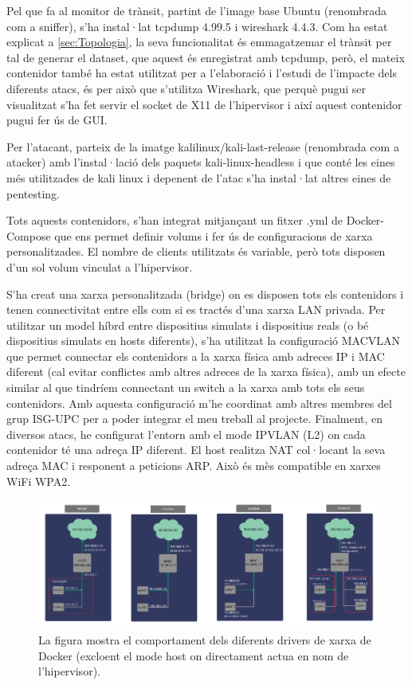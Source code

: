 Pel que fa al monitor de trànsit, partint de l’image base Ubuntu (renombrada com a sniffer), s’ha instal·lat tcpdump 4.99.5 i wireshark 4.4.3. Com ha estat explicat a \ref{sec:Topologia}, la seva funcionalitat és emmagatzemar el trànsit per tal de generar el dataset, que aquest és enregistrat amb tcpdump, però, el mateix contenidor també ha estat utilitzat per a l’elaboració i l’estudi de l’impacte dels diferents atacs, és per això que s’utilitza Wireshark, que perquè pugui ser visualitzat s’ha fet servir el socket de X11 de l’hipervisor i així aquest contenidor pugui fer ús de GUI.

Per l’atacant, parteix de la imatge kalilinux/kali-last-release \cite{kaliimg} (renombrada com a atacker) amb l’instal·lació dels paquets kali-linux-headless i que conté les eines més utilitzades de kali linux i depenent de l’atac s’ha instal·lat altres eines de pentesting.

Tots aquests contenidors, s’han integrat mitjançant un fitxer .yml de Docker-Compose que ens permet definir volums i fer ús de configuracions de xarxa personalitzades. El nombre de clients utilitzats és variable, però tots disposen d’un sol volum vinculat a l'hipervisor.

S’ha creat una xarxa personalitzada (bridge) on es disposen tots els contenidors i tenen connectivitat entre ells com si es tractés d'una xarxa LAN privada. 
Per utilitzar un model híbrd entre dispositius simulats i dispositius reals (o bé dispositius simulats en hosts diferents), s’ha utilitzat la configuració MACVLAN que permet connectar els contenidors a la xarxa física amb adreces IP i MAC diferent (cal evitar conflictes amb altres adreces de la xarxa física), amb un efecte similar al que tindríem connectant un switch a la xarxa amb tots els seus contenidors. Amb aquesta configuració m'he coordinat amb altres membres del grup ISG-UPC per a poder integrar el meu treball al projecte. 
Finalment, en diversos atacs, he configurat l'entorn amb el mode IPVLAN (L2) on cada contenidor té una adreça IP diferent. El host realitza NAT col·locant la seva adreça MAC i responent a peticions ARP. Això és mès compatible en xarxes WiFi WPA2.

 \begin{figure}[H]
    \centering
    \includegraphics[width=1\textwidth]{img/DockerNetworks.png}
    \caption{La figura mostra el comportament dels diferents drivers de xarxa de Docker (excloent el mode host on directament actua en nom de l'hipervisor).}
    \label{fig:DockerNetworks}
  \end{figure}